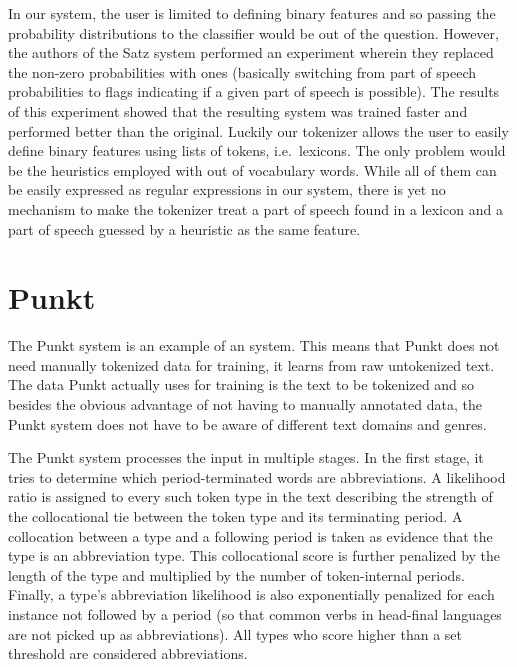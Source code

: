 In our system, the user is limited to defining binary features and so passing
the probability distributions to the classifier would be out of the question.
However, the authors of the Satz system performed an experiment wherein they
replaced the non-zero probabilities with ones (basically switching from part of
speech probabilities to flags indicating if a given part of speech is
possible). The results of this experiment showed that the resulting system was
trained faster and performed better than the original. Luckily our tokenizer
allows the user to easily define binary features using lists of tokens, i.e.\
lexicons. The only problem would be the heuristics employed with out of
vocabulary words. While all of them can be easily expressed as regular
expressions in our system, there is yet no mechanism to make the tokenizer
treat a part of speech found in a lexicon and a part of speech guessed by a
heuristic as the same feature.

\section{Punkt}
\label{sec:survey-punkt}

The Punkt system is an example of an 
system. This means that Punkt does not need manually tokenized data for
training, it learns from raw untokenized text. The data Punkt actually uses for
training is the text to be tokenized and so besides the obvious advantage of
not having to manually annotated data, the Punkt system does not have to be
aware of different text domains and genres.

The Punkt system processes the input in multiple stages. In the first stage, it
tries to determine which period-terminated words are abbreviations. A
likelihood ratio is assigned to every such token type in the text describing
the strength of the collocational tie between the token type and its
terminating period. A collocation between a type and a following period is
taken as evidence that the type is an abbreviation type. This collocational
score is further penalized by the length of the type and multiplied by the
number of token-internal periods. Finally, a type's abbreviation likelihood is
also exponentially penalized for each instance not followed by a period (so
that common verbs in head-final languages are not picked up as abbreviations).
All types who score higher than a set threshold are considered abbreviations.

